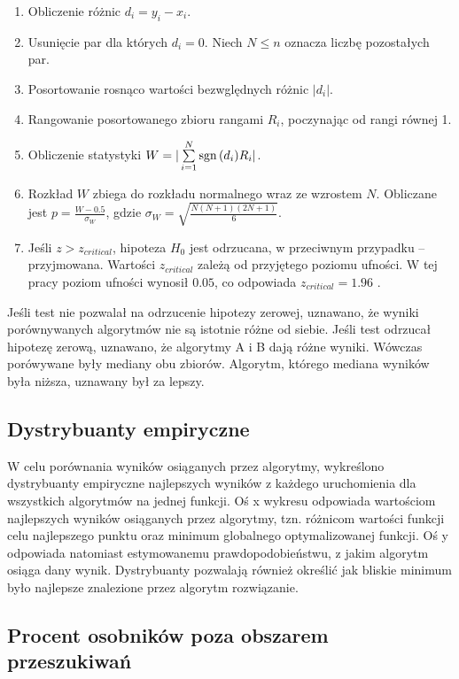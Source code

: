 \documentclass[a4paper,onecolumn,oneside,12pt,wide,floatssmall]{mwrep}
\def\sgn{{\rm sgn}\,}
\theoremstyle{definition}
\theoremstyle{plain}%
\theoremstyle{remark}
\begin{document}
\begin{enumerate}
 \item Obliczenie różnic $d_i = y_i - x_i$.
 \item Usunięcie par dla których $d_i = 0$. Niech $N \leq n$ oznacza liczbę pozostałych par.
 \item Posortowanie rosnąco wartości bezwględnych różnic $|d_i|$.
 \item Rangowanie posortowanego zbioru rangami $R_i$, poczynając od rangi równej 1. 
 \item Obliczenie statystyki $W = |\sum\limits_{i=1}^{N} \sgn(d_i)R_i|$.
 \item Rozkład $W$ zbiega do rozkładu normalnego wraz ze wzrostem $N$. Obliczane jest
 $p = \frac{W - 0.5}{\sigma_W}$, gdzie $\sigma_W = \sqrt{\frac{N(N+1)(2N+1)}{6}}.$ 
 \item Jeśli $z > z_{critical}$, hipoteza $H_0$ jest odrzucana, w przeciwnym przypadku -- przyjmowana. 
Wartości $z_{critical}$ zależą od przyjętego poziomu ufności. 
W tej pracy poziom ufności wynosił $0.05$, co odpowiada $z_{critical}=1.96$ \cite{lowry}.  
\end{enumerate}

Jeśli test nie pozwalał na odrzucenie hipotezy zerowej, uznawano, że wyniki porównywanych algorytmów
nie są istotnie różne od siebie. 
Jeśli test odrzucał hipotezę zerową, uznawano, że algorytmy A i B dają różne wyniki.
Wówczas porówywane były mediany obu zbiorów. Algorytm, którego mediana wyników była niższa,
uznawany był za lepszy.

\subsection{Dystrybuanty empiryczne}
\label{sec:dystrybuanty}

W celu porównania wyników osiąganych przez algorytmy, 
wykreślono dystrybuanty empiryczne najlepszych wyników z każdego uruchomienia 
dla wszystkich algorytmów na jednej funkcji. Oś x wykresu
odpowiada wartościom najlepszych wyników osiąganych przez algorytmy, tzn. różnicom wartości funkcji celu najlepszego
punktu oraz minimum globalnego optymalizowanej funkcji. Oś y odpowiada natomiast 
estymowanemu prawdopodobieństwu, z jakim algorytm osiąga dany wynik. Dystrybuanty pozwalają również
określić jak bliskie minimum było najlepsze znalezione przez algorytm rozwiązanie.

\subsection{Procent osobników poza obszarem przeszukiwań}
\end{document}
